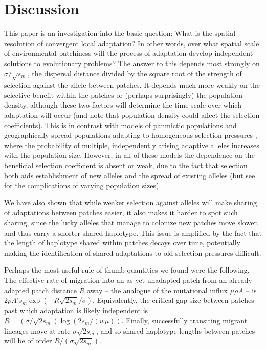 \documentclass[10pt,letterpaper]{article}
\newcommand{\citep}[1]{\cite{#1}}
\newcommand{\citet}[1]{\cite{#1}}
\begin{document}
\section*{Discussion} 
\label{ss:discussion}

This paper is an investigation into the basic question: 
What is the spatial resolution of convergent local adaptation?
In other words, 
over what spatial scale of environmental patchiness will the process
of adaptation develop independent solutions to evolutionary problems?
The answer to this depends most strongly on $\sigma/\sqrt{s_m}$, 
the dispersal distance divided by the square root of the strength of selection against the allele between patches. 
It depends much more weakly on the
selective benefit within the patches or (perhaps surprisingly) the population density, 
although these two factors will determine the time-scale over which adaptation will occur
(and note that population density could affect the selection coefficients). 
This is in contrast with models of panmictic populations
\citep{softsweepsI, MesserPetrov, wilson2014selective} 
and geographically spread populations adapting to homogeneous selection pressures \citep{ralph2010parallel}, 
where the probability of multiple, independently arising adaptive alleles increases with the population size.
However, in all of these models the dependence on the beneficial selection
coefficient is absent or weak, due to the fact that selection both
aids establishment of new alleles and the spread of existing
alleles (but see \citet{wilson2014selective} for the complications of varying population sizes). 

We have also shown that
while weaker selection against alleles will make sharing 
of adaptations between patches easier, 
it also makes it harder to spot such sharing,
since the lucky alleles that manage to colonize new patches move slower,
and thus carry a shorter shared haplotype.
This issue is amplified by the fact that the length of haplotype
shared within patches decays over time, potentially making the
identification of shared adaptations to old selection pressures difficult.

Perhaps the most useful rule-of-thumb quantities we found were the following.
The effective rate of migration into an as-yet-unadapted patch from an already-adapted patch distance $R$ away 
-- the analogue of the mutational influx $\mu \rho A$ --
is $2 \rho A' s_m \exp(- R \sqrt{2 s_m} / \sigma)$.
Equivalently, the critical gap size between patches past which adaptation is likely independent
is $R = (\sigma/\sqrt{2s_m}) \log(2s_m/(w \mu))$.
Finally, successfully transiting migrant lineages move at rate $\sigma \sqrt{2s_m}$,
and so shared haplotype lengths between patches will be of order $R/(\sigma \sqrt{2s_m})$.
\end{document}
